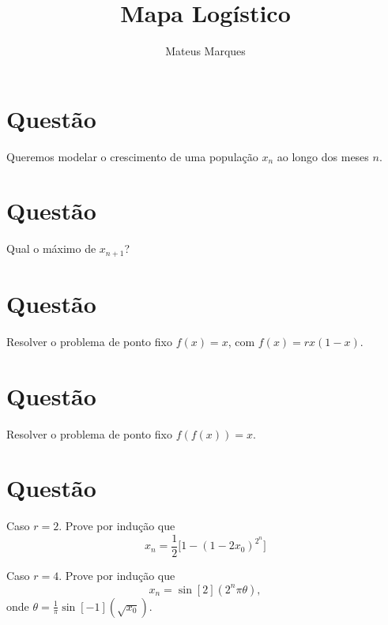 \documentclass[a4paper,fleqn,12pt]{article}
\title{\Huge{\textbf{Mapa Logístico}}}
\author{Mateus Marques}
\begin{document}
\maketitle

\section{Questão}

Queremos modelar o crescimento de uma população $x_n$ ao longo dos meses $n$.

\section{Questão}

Qual o máximo de $x_{n+1}$?

\section{Questão}

Resolver o problema de ponto fixo $f(x) = x$, com $f(x) = rx(1-x)$.

\section{Questão}

Resolver o problema de ponto fixo $f(f(x)) = x$.


\section{Questão}

Caso $r = 2$. Prove por indução que
$$
x_n = \frac{1}{2} \Big[ 1 - (1-2x_0)^{2^n} \Big]
$$

Caso $r = 4$. Prove por indução que
$$
x_n = \sin[2](2^n \pi \theta),
$$
onde $\theta = \frac{1}{\pi} \sin[-1](\sqrt{x_0})$.
\end{document}
